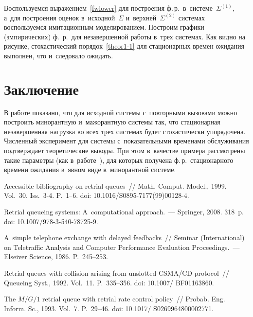 \begin{multicols}{2}
Воспользуемся выражением~\eqref{fwlower} для по\-стро\-ения ф.\,р.\ 
в~сис\-те\-ме~$\Sigma^{(1)}$, а~для по\-стро\-ения оценок в~исходной~$\Sigma$ и~верхней~$\Sigma^{(2)}$ 
сис\-те\-мах воспользуемся имитационным моделированием.
Построим графики (эмпирических) ф.~р.\ для незавершенной 
работы в~трех сис\-те\-мах. Как видно на рисунке, стохастический 
порядок~\eqref{theor1-1} для стационарных времен ожидания выполнен, что 
и~следовало ожидать.






\section{Заключение}

В работе показано, что для исходной системы с~повторными вызовами можно 
построить минорантную и~мажорантную системы так, что стационарная незавершенная 
нагрузка во всех трех сис\-те\-мах будет стохастически упорядочена. Численный 
эксперимент для сис\-те\-мы с~показательными временами обслуживания подтверждает 
теоретические выводы. При этом в~качестве примера рас\-смот\-ре\-ны такие па\-ра\-мет\-ры 
(как в~работе~\cite{rego}), для которых получена ф.\,р.\ 
стационарного времени ожидания в~явном виде в~минорантной сис\-теме.


{\small\frenchspacing
 { %
 \begin{thebibliography}{99}

 {Accessible bibliography on retrial queues}~// Math. 
Comput. Model., 1999. Vol.~30. Iss.~3-4. P.~1--6. doi: 10.1016/S0895-7177(99)00128-4.


{Retrial queueing systems: A~computational approach}.~---   Springer, 2008. 318~p.
doi: 10.1007/978-3-540-78725-9.


A~simple telephone exchange with delayed feedbacks~// 
Seminar (International) on Teletraffic Analysis and Computer Performance 
Evaluation Proceedings.~--- Elseiver Science, 1986. P.~245--253.

\bibitem{CSA92}
Retrial queues with collision arising from unslotted {CSMA/CD} protocol~//
Queueing Syst., 1992.  Vol.~11. P.~335--356. doi: 10.1007/ BF01163860.

\bibitem{CRP93}
 {The $M/G/1$ retrial queue with
retrial rate control policy}~//
Probab.  Eng. Inform. Sc., 1993.  Vol.~7. P.~29--46. doi: 10.1017/ S0269964800002771.


\end{thebibliography}}}
\end{multicols}
